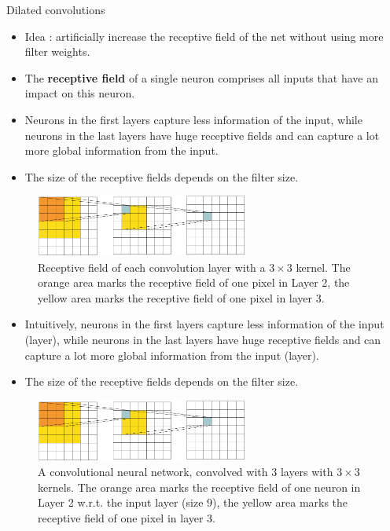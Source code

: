 \begin{vbframe}{Dilated convolutions}

    \begin{itemize}
        \item Idea : artificially increase the receptive field of the net without using more filter weights.
        \item The \textbf{receptive field} of a single neuron comprises all inputs that have an impact on this neuron. 
        \item Neurons in the first layers capture less information of the input, while neurons in the last layers have huge receptive fields and can capture a lot more global information from the input. 
        \item The size of the receptive fields depends on the filter size. 
    \end{itemize}

    \vspace*{-0.5cm}

    \begin{figure}
        \centering
        \includegraphics[width=7cm]{figure/dilatedconv-6.png}
        \caption{Receptive field of each convolution layer with a $3 \times 3$ kernel. The orange area marks the receptive field of one pixel in Layer 2, the yellow area marks the receptive field of one pixel in layer 3. } 
    \end{figure}


\begin{itemize}
        \item Intuitively, neurons in the first layers capture less information of the input (layer), while neurons in the last layers have huge receptive fields and can capture a lot more global information from the input (layer). 
        \item The size of the receptive fields depends on the filter size. 
    \end{itemize}

    \vspace*{-0.5cm}

    \begin{figure}
        \centering
        \includegraphics[width=7cm]{figure/dilatedconv-6.png}
        \caption{A convolutional neural network, convolved with $3$ layers with $3 \times 3$ kernels. The orange area marks the receptive field of one neuron in Layer 2 w.r.t. the input layer (size $9$), the yellow area marks the receptive field of one pixel in layer 3. } 
    \end{figure}


\end{vbframe}
